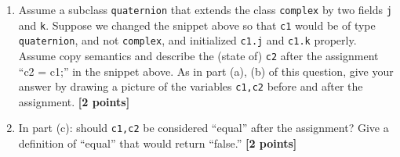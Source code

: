 \documentclass{article}
\begin{document}
\begin{enumerate}
\begin{enumerate}
\item Assume a subclass \texttt{quaternion} that extends the class
\texttt{complex}
by two fields \texttt{j}  and \texttt{k}.  Suppose we changed the snippet above 
so that \texttt{c1} would be of type \texttt{quaternion}, and not
\texttt{complex}, and initialized \texttt{c1.j} and \texttt{c1.k} properly. 
Assume copy semantics and describe the (state of)  \texttt{c2} 
 after the assignment ``c2 = c1;'' in the snippet above. 
As in part (a), (b) of this question, give your answer by drawing
 a picture of the variables \texttt{c1,c2} 
before and after the assignment.
{\textbf{[2 points]}}
\item In part (c): should \texttt{c1,c2} be considered ``equal'' after
the assignment? Give a definition of ``equal'' that would return 
``false.''  {\textbf{[2 points]}}
\end{enumerate}
\end{enumerate}
\newpage
\end{document}
